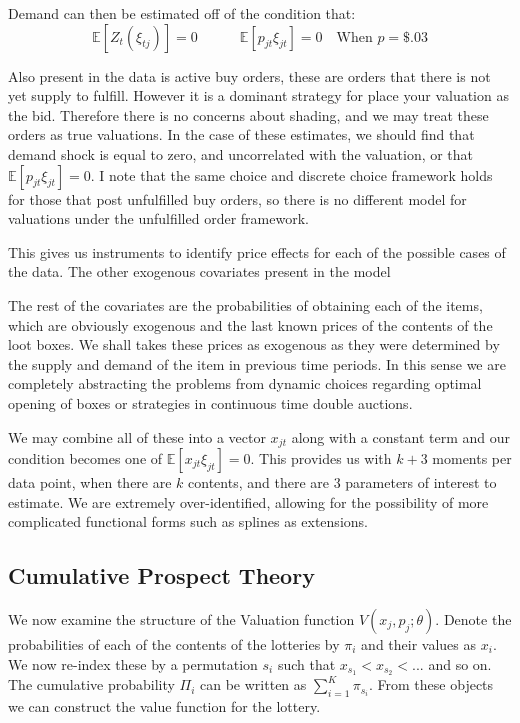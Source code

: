 \documentclass[12pt]{paper}
\newcommand{\exV}[1]{\mathbb{E} \left [ #1 \right ]}
\begin{document}
Demand can then be estimated off of the condition that:
\begin{equation*}
  \exV{Z_t (\xi_{tj})} = 0 \quad \quad \quad \exV{ p_{jt} \xi_{jt} } = 0 \quad \text{When } p = \$.03
\end{equation*}

Also present in the data is active buy orders, these are orders
that there is not yet supply to fulfill. However it is a dominant
strategy for place your valuation as the bid. Therefore there is no
concerns about shading, and we may treat these orders as true
valuations. In the case of these estimates, we should find that demand
shock is equal to zero, and uncorrelated with the valuation, or that
$\exV{p_{jt}\xi_{jt}} = 0$. I note that the same choice and discrete
choice framework holds for those that post unfulfilled buy orders, so
there is no different model for valuations under the unfulfilled order
framework. 

This gives us instruments to identify price effects for each of the
possible cases of the data. The other exogenous covariates present in
the model 


The rest of the covariates are the
probabilities of obtaining each of the items, which are obviously
exogenous and the last known prices of the contents of the loot
boxes. We shall takes these prices as exogenous as they were
determined by the supply and demand of the item in previous time
periods. In this sense we are completely abstracting the problems from
dynamic choices regarding optimal opening of boxes or strategies in
continuous time double auctions. 

We may combine all of these into a vector $x_{jt}$ along with a
constant term and our condition becomes one of
$\exV{x_{jt}\xi_{jt}} = 0$. This provides us with $k + 3$ moments per
data point, when there are $k$ contents, and there are $3$
parameters of interest to estimate. We are extremely over-identified,
allowing for the possibility of more complicated functional forms such
as splines as extensions. 




\subsection{Cumulative Prospect Theory}


We now examine the structure of the Valuation function $V( x_j,
p_j; \theta)$. Denote the probabilities of each of the contents of the
lotteries by $\pi_i$ and their values as $x_i$. We now re-index these by
a permutation $s_i$ such that $x_{s_1} < x_{s_2} < ...$ and so on. The
cumulative probability $\Pi_i$ can be written as $\sum_{i=1}^K
\pi_{s_i}$. From these objects we can construct the value function for
the lottery.
\end{document}

